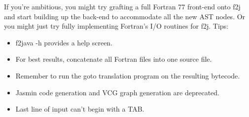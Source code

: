 \documentclass[11pt]{article}
\begin{document}
If you're ambitious, you might try grafting a full Fortran 77 front-end onto
f2j and start building up the back-end to accommodate all the new AST nodes. Or
you might just try fully implementing Fortran's I/O routines for f2j.  Tips:

\begin{itemize}
\item f2java -h provides a help screen.
\item For best results, concatenate all Fortran files into one source file.
\item Remember to run the goto translation program on the resulting bytecode.
\item Jasmin code generation and VCG graph generation are deprecated.
\item Last line of input can't begin with a TAB.
\end{itemize}
\end{document}
